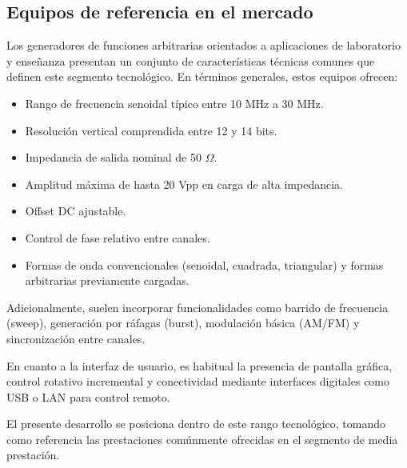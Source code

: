 \subsection{Equipos de referencia en el mercado}
Los generadores de funciones arbitrarias orientados a aplicaciones de laboratorio y enseñanza presentan un conjunto de características técnicas comunes que definen este segmento tecnológico. En términos generales, estos equipos ofrecen:

\begin{itemize}
	\item Rango de frecuencia senoidal típico entre 10 MHz a 30 MHz.
	\item Resolución vertical comprendida entre 12 y 14 bits.
	\item Impedancia de salida nominal de 50 $\Omega$.
	\item Amplitud máxima de hasta 20 Vpp en carga de alta impedancia.
	\item Offset DC ajustable.
	\item Control de fase relativo entre canales.
	\item Formas de onda convencionales (senoidal, cuadrada, triangular) y formas arbitrarias previamente cargadas.
\end{itemize}

Adicionalmente, suelen incorporar funcionalidades como barrido de frecuencia (sweep), generación por ráfagas (burst), modulación básica (AM/FM) y sincronización entre canales.

En cuanto a la interfaz de usuario, es habitual la presencia de pantalla gráfica, control rotativo incremental y conectividad mediante interfaces digitales como USB o LAN para control remoto.

El presente desarrollo se posiciona dentro de este rango tecnológico, tomando como referencia las prestaciones comúnmente ofrecidas en el segmento de media prestación.

